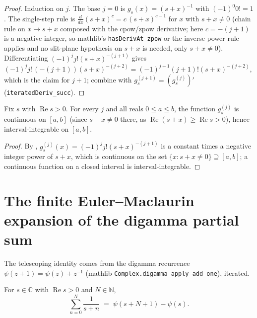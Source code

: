 \begin{proof}
\leanok
{}
Induction on $j$. The base $j=0$ is $g_s(x)=(s+x)^{-1}$ with $(-1)^0 0!=1$. The
single-step rule is $\frac{d}{dx}(s+x)^{c}=c\,(s+x)^{c-1}$ for $x$ with $s+x\neq0$
(chain rule on $x\mapsto s+x$ composed with the cpow/zpow derivative; here
$c=-(j+1)$ is a negative integer, so mathlib's \texttt{hasDerivAt\_zpow} or the
inverse-power rule applies and no slit-plane hypothesis on $s+x$ is needed, only
$s+x\neq0$). Differentiating $(-1)^{j}j!(s+x)^{-(j+1)}$ gives
$(-1)^{j}j!\,(-(j+1))(s+x)^{-(j+2)}=(-1)^{j+1}(j+1)!(s+x)^{-(j+2)}$, which is the
claim for $j+1$; combine with $g_s^{(j+1)}=(g_s^{(j)})'$
(\texttt{iteratedDeriv\_succ}).
\end{proof}

\begin{lemma}
\label{lem:gs_integrable}
\leanok
{}
Fix $s$ with $\operatorname{Re}s>0$. For every $j$ and all reals $0\le a\le b$, the
function $g_s^{(j)}$ is continuous on $[a,b]$ (since $s+x\neq0$ there, as
$\operatorname{Re}(s+x)\ge\operatorname{Re}s>0$), hence interval-integrable on
$[a,b]$.
\end{lemma}

\begin{proof}
\leanok
{}
By , $g_s^{(j)}(x)=(-1)^jj!(s+x)^{-(j+1)}$ is a constant
times a negative integer power of $s+x$, which is continuous on the set
$\{x:s+x\neq0\}\supseteq[a,b]$; a continuous function on a closed interval is
interval-integrable.
\end{proof}

\section{The finite Euler--Maclaurin expansion of the digamma partial sum}
\label{sec:gs_finite}

The telescoping identity comes from the digamma recurrence
$\psi(z+1)=\psi(z)+z^{-1}$ (mathlib \texttt{Complex.digamma\_apply\_add\_one}),
iterated.

\begin{lemma}
\label{lem:gs_telescope}
\leanok
For $s\in\mathbb{C}$ with $\operatorname{Re}s>0$ and $N\in\mathbb{N}$,
\[
  \sum_{n=0}^{N}\frac{1}{s+n} \;=\; \psi(s+N+1)-\psi(s).
\]
\end{lemma}

